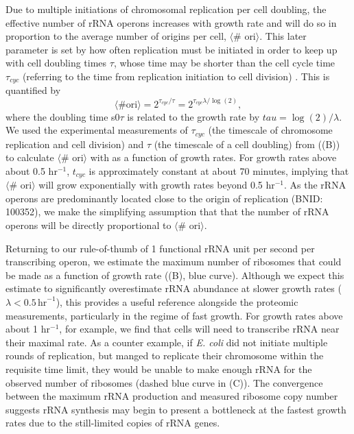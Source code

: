 Due to multiple initiations of chromosomal replication per cell doubling, the
effective number of rRNA operons increases with growth rate and will do so in
proportion to the average number of origins per cell, $\langle$\# ori$\rangle$.
This later parameter is set by how often replication must be initiated in order
to keep up with cell doubling times $\tau$, whose time may be shorter than the
cell cycle time $\tau_{cyc}$ (referring to the time from replication initiation to
cell division) \citep{dennis2004, ho2015}. This is quantified by
\begin{equation}
    \langle \text{\# ori} \rangle = 2^{\tau_{cyc} / \tau} = 2^{\tau_{cyc} \lambda / \log(2)},
    \label{eq:Nori}
\end{equation}
where the doubling time s0$\tau$ is related to the growth rate by $tau =
\log(2)/\lambda$. We used the experimental measurements of $\tau_{cyc}$ (the
timescale of chromosome replication and cell division) and $\tau$ (the timescale
of a cell doubling) from \cite{si2017}
((B)) to calculate $\langle$\#
ori$\rangle$  with  as a function of growth rates. For growth rates
above about 0.5 hr$^{-1}$, $t_{cyc}$ is approximately constant at about 70
minutes, implying that $\langle$\# ori$\rangle$ will grow exponentially with
growth rates beyond 0.5 hr$^{-1}$. As the rRNA operons are predominantly located
close to the origin of replication (BNID: 100352), we make the simplifying
assumption that that the number of rRNA operons  will be directly proportional
to $\langle$\# ori$\rangle$.

Returning to our rule-of-thumb of 1 functional rRNA unit per second per
transcribing operon, we estimate the maximum number of ribosomes that could be
made as a function of growth rate ((B), blue curve).
Although we expect this estimate to significantly overestimate rRNA abundance at
slower growth rates ($\lambda < 0.5\, \text{hr}^{-1}$), this provides a useful
reference alongside the proteomic measurements, particularly in the regime of
fast growth. For growth rates above about 1 hr$^{-1}$, for example, we find that
cells will need to transcribe rRNA near their maximal rate. As a counter
example, if \textit{E. coli} did not initiate multiple rounds of replication,
but manged to replicate their chromosome within the requisite time limit, they
would be unable to make enough rRNA for the observed number of ribosomes (dashed
blue curve in (C)). The convergence between the maximum rRNA
production and measured ribosome copy number suggests rRNA synthesis may begin
to present a bottleneck at the fastest growth rates due to the still-limited
copies of rRNA genes.


